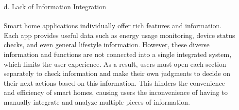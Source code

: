 \documentclass[conference]{IEEEtran}
\begin{document}
\begin{itemize}
    \item [d.] Lack of Information Integration \\ \\
    Smart home applications individually offer rich features and information. Each app provides useful data such as energy usage monitoring, device status checks, and even general lifestyle information. However, these diverse information and functions are not connected into a single integrated system, which limits the user experience. As a result, users must open each section separately to check information and make their own judgments to decide on their next actions based on this information. This hinders the convenience and efficiency of smart homes, causing users the inconvenience of having to manually integrate and analyze multiple pieces of information.
    
\end{itemize} 
\end{document}
